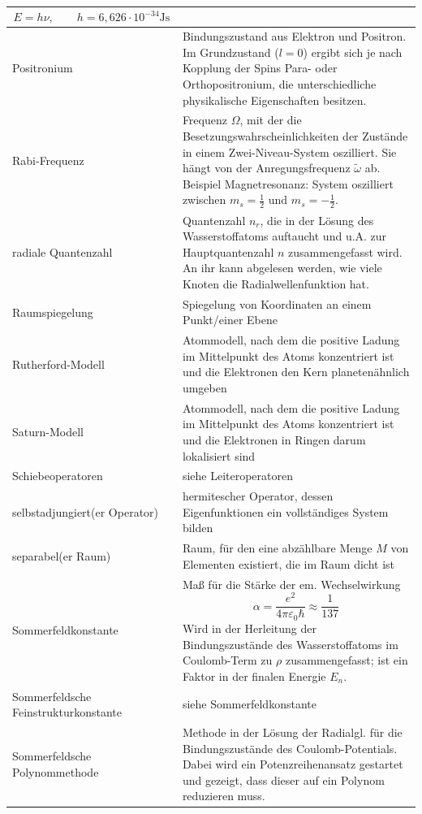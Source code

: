 \documentclass{article}
\begin{document}
\begin{xltabular}{\linewidth}{l|X}
			$$E = h\nu,\qquad h = 6,626\cdot 10^{-34}\text{Js}$$ \\
	\hline
		Positronium & Bindungszustand aus Elektron und Positron. Im Grundzustand ($l=0$) ergibt sich je nach Kopplung der Spins Para- oder Orthopositronium, die unterschiedliche physikalische Eigenschaften besitzen. \\
	\hline
		Rabi-Frequenz & Frequenz $\Omega$, mit der die Besetzungswahrscheinlichkeiten der Zustände in einem Zwei-Niveau-System oszilliert. Sie hängt von der Anregungsfrequenz $\tilde{\omega}$ ab. Beispiel Magnetresonanz: System oszilliert zwischen $m_s = \frac{1}{2}$ und $m_s = -\frac{1}{2}$.\\
	\hline
		radiale Quantenzahl & Quantenzahl $n_r$, die in der Lösung des Wasserstoffatoms auftaucht und u.A. zur Hauptquantenzahl $n$ zusammengefasst wird. An ihr kann abgelesen werden, wie viele Knoten die Radialwellenfunktion hat.\\
	\hline
		Raumspiegelung & Spiegelung von Koordinaten an einem Punkt/einer Ebene \\
	\hline
		Rutherford-Modell & Atommodell, nach dem die positive Ladung im Mittelpunkt des Atoms konzentriert ist und die Elektronen den Kern planetenähnlich umgeben \\
	\hline
		Saturn-Modell & Atommodell, nach dem die positive Ladung im Mittelpunkt des Atoms konzentriert ist und die Elektronen in Ringen darum lokalisiert sind \\
	\hline
		Schiebeoperatoren & siehe Leiteroperatoren \\
	\hline
		selbstadjungiert(er Operator) & hermitescher Operator, dessen Eigenfunktionen ein vollständiges System bilden \\
	\hline
		separabel(er Raum) & Raum, für den eine abzählbare Menge $M$ von Elementen existiert, die im Raum dicht ist \\
	\hline
		Sommerfeldkonstante & Maß für die Stärke der em. Wechselwirkung
			$$\alpha = \frac{e^2}{4\pi\varepsilon_0 \hbar} \approx \frac{1}{137}$$
			\textcolor{gruen}{Wird in der Herleitung der Bindungszustände des Wasserstoffatoms im Coulomb-Term zu $\rho$ zusammengefasst; ist ein Faktor in der finalen Energie $E_n$.}\\
	\hline
		Sommerfeldsche Feinstrukturkonstante & siehe Sommerfeldkonstante \\
	\hline
		Sommerfeldsche Polynommethode & Methode in der Lösung der Radialgl. für die Bindungszustände des Coulomb-Potentials. Dabei wird ein Potenzreihenansatz gestartet und gezeigt, dass dieser auf ein Polynom reduzieren muss. \\

\end{xltabular}
\end{document}
